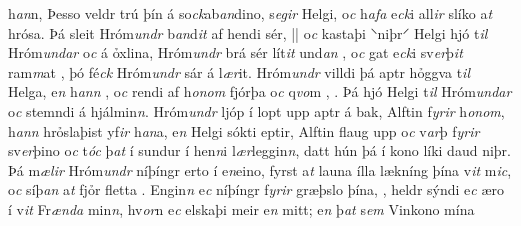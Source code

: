 h\textit{an}n,  Þesso veldr trú þín á
so\textit{ck}ab\textit{an}dino, s\textit{egir} Helgi, o\textit{c} h\textit{afa}
e\textit{ck}i  all\textit{ir} slíko a\textit{t} hrósa. Þá sleit
Hróm\textit{undr} b\textit{an}d\textit{it} af hendi sér, || o\textit{c} kastaþi ⸌niþr⸍ Helgi hjó t\textit{il}
Hróm\textit{undar} o\textit{c}  á ỏxlina, 
Hróm\textit{undr} brá sér lít\textit{it}
und\textit{an} , o\textit{c} gat e\textit{ck}i sv\textit{er}þ\textit{it} ram\textit{m}at  , þó fé\textit{ck} Hróm\textit{undr} sár á l\textit{ær}it.
Hróm\textit{undr} villdi þá aptr hỏggva t\textit{il} Helga,
e\textit{n} h\textit{ann}  , o\textit{c} rendi af  h\textit{onom} fjórþa   o\textit{c} q\textit{vo}m  ,  . Þá hjó Helgi t\textit{il} Hróm\textit{undar} o\textit{c} stemndi á hjálmin\textit{n}. 
Hróm\textit{undr} ljóp í lopt upp aptr á bak,   Alftin  f\textit{yrir} h\textit{onom}, h\textit{ann}
hrỏslaþist yf\textit{ir} h\textit{an}a, e\textit{n} Helgi sókti   eptir,  Alftin flaug upp   o\textit{c} v\textit{ar}þ f\textit{yrir} sv\textit{er}þino o\textit{c}
t\textit{óc} þ\textit{at} í sundur í  hen\textit{n}i
l\textit{ær}leggin\textit{n}, datt hún þá í kono líki daud niþr.  Þá m\textit{ælir} Hróm\textit{undr} níþíngr erto   í   e\textit{n}eino,  fyrst a\textit{t} launa ílla lækníng þína
v\textit{it} m\textit{ic}, o\textit{c} síþ\textit{an} a\textit{t} fjỏr fletta   . Engin\textit{n}  e\textit{c} níþíngr f\textit{yrir} græþslo þína,  , heldr sýndi e\textit{c} æro í   v\textit{it} Fr\textit{ænda} min\textit{n}, hv\textit{or}n e\textit{c} elskaþi meir e\textit{n}  mitt; 
e\textit{n} þ\textit{at} s\textit{em} Vinkono  mína
